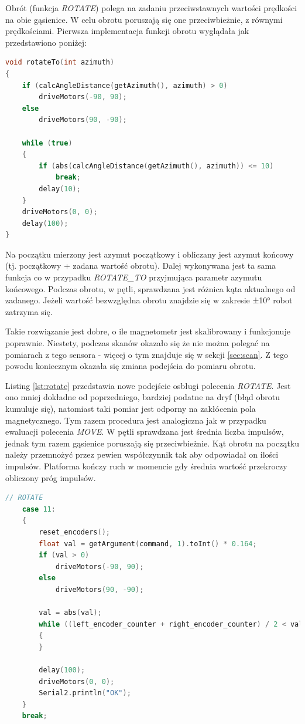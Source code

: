 Obrót (funkcja \emph{ROTATE}) polega na zadaniu przeciwstawnych wartości prędkości na obie gąsienice. W celu obrotu poruszają się one przeciwbieżnie, z równymi prędkościami. Pierwsza implementacja funkcji obrotu wyglądała jak przedstawiono poniżej:

\begin{lstlisting}[basicstyle=\footnotesize\ttfamily,language=c++,caption=Funkcja będąca głównym elementem obsługi poleceń \emph{ROTATE} oraz \emph{ROTATE\_TO},label=lst:rotate-to-function]
void rotateTo(int azimuth)
{
    if (calcAngleDistance(getAzimuth(), azimuth) > 0)
        driveMotors(-90, 90);
    else
        driveMotors(90, -90);

    while (true)
    {
        if (abs(calcAngleDistance(getAzimuth(), azimuth)) <= 10)
            break;
        delay(10);
    }
    driveMotors(0, 0);
    delay(100);
}
\end{lstlisting}

Na początku mierzony jest azymut początkowy i obliczany jest azymut końcowy (tj. początkowy + zadana wartość obrotu). Dalej wykonywana jest ta sama funkcja co w przypadku \emph{ROTATE\_TO} przyjmująca parametr azymutu końcowego. Podczas obrotu, w pętli, sprawdzana jest różnica kąta aktualnego od zadanego. Jeżeli wartość bezwzględna obrotu znajdzie się w zakresie ±10° robot zatrzyma się.

Takie rozwiązanie jest dobre, o ile magnetometr jest skalibrowany i funkcjonuje poprawnie. Niestety, podczas skanów okazało się że nie można polegać na pomiarach z tego sensora - więcej o tym znajduje się w sekcji \ref{sec:scan}. Z tego powodu koniecznym okazała się zmiana podejścia do pomiaru obrotu.

Listing \ref{lst:rotate} przedstawia nowe podejście osbługi polecenia \emph{ROTATE}. Jest ono mniej dokładne od poprzedniego, bardziej podatne na dryf (błąd obrotu kumuluje się), natomiast taki pomiar jest odporny na zakłócenia pola magnetycznego.
Tym razem procedura jest analogiczna jak w przypadku ewaluacji polecenia \emph{MOVE}. W pętli sprawdzana jest średnia liczba impulsów, jednak tym razem gąsienice poruszają się przeciwbieżnie. Kąt obrotu na początku należy przemnożyć przez pewien współczynnik tak aby odpowiadał on ilości impulsów. Platforma kończy ruch w momencie gdy średnia wartość przekroczy obliczony próg impulsów.

\begin{lstlisting}[basicstyle=\footnotesize\ttfamily,language=c++,caption=Nowa implementacja obsługi polecenia \emph{ROTATE},label=lst:rotate]
// ROTATE
    case 11:
    {
        reset_encoders();
        float val = getArgument(command, 1).toInt() * 0.164;
        if (val > 0)
            driveMotors(-90, 90);
        else
            driveMotors(90, -90);

        val = abs(val);
        while ((left_encoder_counter + right_encoder_counter) / 2 < val)
        {
        }

        delay(100);
        driveMotors(0, 0);
        Serial2.println("OK");
    }
    break;
\end{lstlisting}

